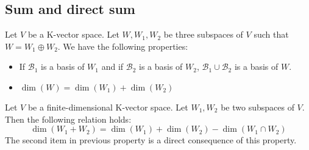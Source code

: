 \subsection{Sum and direct sum}

        
        \begin{theorem}
			\label{linalgebra:theorem:direct_sum}
            Let $V$ be a K-vector space. Let $W, W_1, W_2$ be three subspaces of $V$ such that $W=W_1\oplus W_2$. We have the following properties:
            \begin{itemize}
				\item If $\mathcal{B}_1$ is a basis of $W_1$ and if $\mathcal{B}_2$ is a basis of $W_2$, $\mathcal{B}_1\cup\mathcal{B}_2$ is a basis of $W$.
                \item $\dim(W) = \dim(W_1) + \dim(W_2)$
			\end{itemize}
		\end{theorem}
        \begin{theorem}
			\label{linalgebra:theorem:sum}
            Let $V$ be a finite-dimensional K-vector space. Let $W_1, W_2$ be two subspaces of $V$. Then the following relation holds:
            \begin{equation}
				\dim(W_1 + W_2) = \dim(W_1) + \dim(W_2) - \dim(W_1\cap W_2)
			\end{equation}
            The second item in previous property is a direct consequence of this property.
		\end{theorem}

